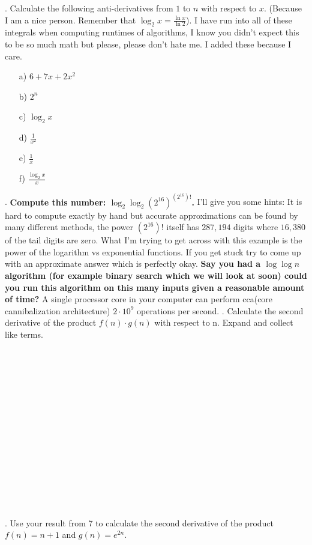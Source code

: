 \documentclass[12pt]{article}
\begin{document}
\newpage
{}. Calculate the following anti-derivatives from $1$ to $n$ with respect to $x$. (Because I am a nice person. Remember that $\log_2{x}=\frac{\ln{x}}{\ln{2}}$). I have run into all of these integrals when computing runtimes of algorithms, I know you didn't expect this to be so much math but please, please don't hate me. I added these because I care.
\begin{enumerate}
    \item[a)]$6+7x+2x^2$
    \item[b)]$2^n$
    \item[c)]$\log_{2}{x}$
    \item[d)]$\frac{1}{x^2}$
    \item[e)]$\frac{1}{x}$
    \item[f)]$\frac{\log_{2}{x}}{x}$
\end{enumerate}
\newpage
{}. \textbf{Compute this number: $\log_{2}{\log_{2}{(2^{16})^{(2^{16})!}}}$.} I'll give you some hints:
It is hard to compute exactly by hand but accurate approximations can be found by many different methods, the power $(2^{16})!$ itself has $287,194$ digits where $16,380$ of the tail digits are zero.
What I'm trying to get across with this example is the power of the logarithm vs exponential functions. If you get stuck try to come up
with an approximate answer which is perfectly okay. \textbf{Say you had a $\log{\log{n}}$ algorithm (for example binary search 
which we will look at soon) could you
run this algorithm on this many inputs given a reasonable amount of time?} A single processor core in your computer can perform cca(core cannibalization architecture) $2 \cdot 10^9$ operations per second.
\newpage
{}. Calculate the second derivative of the product $f(n) \cdot g(n)$ with respect to n. Expand and collect like terms.\\\\\\\\\\\\\\\\\\\\\\\\\\\\\\\\
. Use your result from 7 to calculate the second derivative of the product $f(n) = n + 1$ and $g(n)=e^{2n}$.\\\\\\\\\\\\\\\\\\\\\\\\
\end{document}
